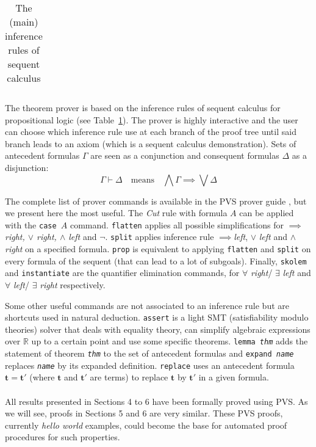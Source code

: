 \begin{table}[ht]
\begin{center}
\begin{tabular}{|c||c|c|}
\end{tabular}
\end{center}

\caption{The (main) inference rules of sequent calculus}\label{LK}

\end{table}

The theorem prover is based on the inference rules of sequent calculus for propositional logic (see Table~\ref{LK}).
The prover is highly interactive and the user can choose which inference rule use at each branch of the proof tree until said branch leads to an axiom (which is a sequent calculus demonstration).
Sets of antecedent formulas $\Gamma$ are seen as a conjunction and consequent formulas $\Delta$ as a disjunction:
\[ \Gamma \vdash \Delta \quad \textrm{means} \quad \bigwedge \Gamma \implies \bigvee \Delta \]

The complete list of prover commands is available in the PVS prover guide \cite{PVS:prover}, but we present here the most useful. The \emph{Cut} rule with formula $A$ can be applied with the \texttt{case $A$} command.
\texttt{flatten} applies all possible simplifications for \emph{$\implies$ right, $\vee$ right, $\wedge$ left} and $\neg$.
\texttt{split} applies inference rule $\implies$\emph{left}, $\vee$ \emph{left} and $\wedge$ \emph{right} on a specified formula. 
\texttt{prop} is equivalent to applying \texttt{flatten} and \texttt{split} on every formula of the sequent (that can lead to a lot of subgoals).
Finally, \texttt{skolem} and \texttt{instantiate} are the quantifier elimination commands, for $\forall$ \emph{right}/ $\exists$ \emph{left} and $\forall$ \emph{left}/ $\exists$ \emph{right} respectively.

Some other useful commands are not associated to an inference rule but are shortcuts used in natural deduction.
\texttt{assert} is a light SMT (satisfiability modulo theories) solver that deals with equality theory, can simplify algebraic expressions over $\mathbb{R}$ up to a certain point and use some specific theorems.
\texttt{lemma \emph{thm}} adds the statement of theorem \texttt{\emph{thm}} to the set of antecedent formulas and \mbox{\texttt{expand \emph{name}}} replaces \texttt{\emph{name}} by its expanded definition.
\texttt{replace} uses an antecedent formula $\mathbf{t = t'}$ (where $\mathbf{t}$ and $\mathbf{t'}$ are terms) to replace $\mathbf{t}$ by $\mathbf{t'}$ in a given formula.


\paragraph{ } All results presented in Sections 4 to 6 have been formally proved using PVS. As we will see, proofs in Sections 5 and 6 are very similar.
These PVS proofs, currently \emph{hello world} examples, could become the base for automated proof procedures for such properties.


